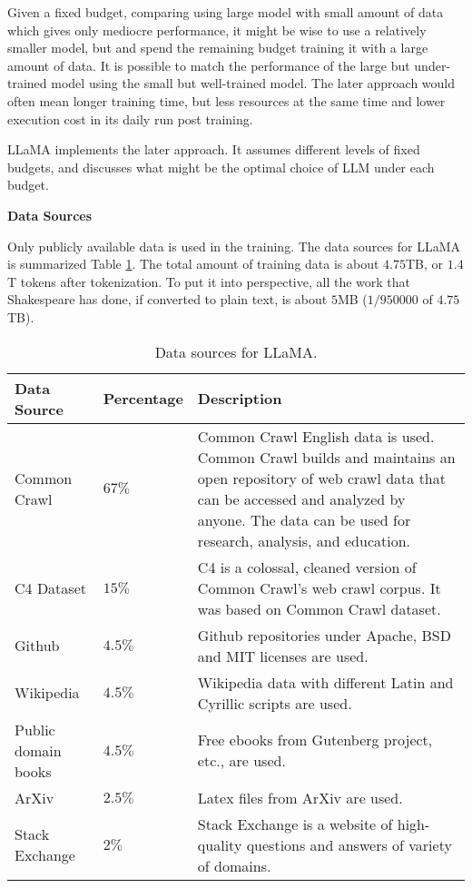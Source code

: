 Given a fixed budget, comparing using large model with small amount of data which gives only mediocre performance, it might be wise to use a relatively smaller model, but and spend the remaining budget training it with a large amount of data. It is possible to match the performance of the large but under-trained model using the small but well-trained model. The later approach would often mean longer training time, but less resources at the same time and lower execution cost in its daily run post training.

LLaMA implements the later approach. It assumes different levels of fixed budgets, and discusses what might be the optimal choice of LLM under each budget.

\vspace{0.1in}
\noindent \textbf{Data Sources}
\vspace{0.1in}

Only publicly available data is used in the training. The data sources for LLaMA is summarized Table \ref{tab:llama:data_sources}. The total amount of training data is about $4.75$TB, or $1.4$T tokens after tokenization. To put it into perspective, all the work that Shakespeare has done, if converted to plain text, is about $5$MB ($1/950000$ of $4.75$TB).

\begin{table}[htbp]
	\centering
	\caption{Data sources for LLaMA.} \label{tab:llama:data_sources}
	\begin{tabularx}{\textwidth}{|l|l|X|}
		\hline
		Data Source & Percentage & Description \\ \hline
		Common Crawl & $67\%$ & Common Crawl English data is used. Common Crawl builds and maintains an open repository of web crawl data that can be accessed and analyzed by anyone. The data can be used for research, analysis, and education. \\ \hline
		C4 Dataset & $15\%$ & C4 is a colossal, cleaned version of Common Crawl's web crawl corpus. It was based on Common Crawl dataset. \\ \hline
		Github & $4.5\%$ & Github repositories under Apache, BSD and MIT licenses are used. \\ \hline
		Wikipedia & $4.5\%$ & Wikipedia data with different Latin and Cyrillic scripts are used. \\ \hline
		Public domain books & $4.5\%$ & Free ebooks from Gutenberg project, etc., are used. \\ \hline
		ArXiv & $2.5\%$ & Latex files from ArXiv are used. \\ \hline
		Stack Exchange & $2\%$ & Stack Exchange is a website of high-quality questions and answers of variety of domains. \\
		\hline
	\end{tabularx}
\end{table}

